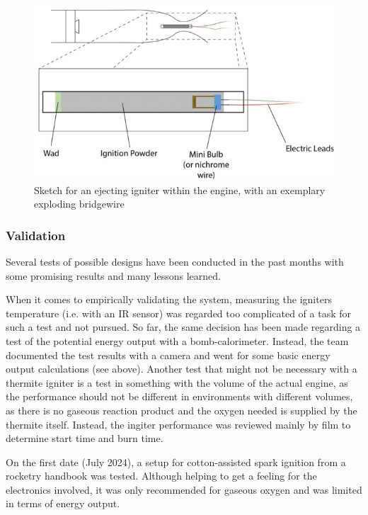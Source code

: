          \begin{figure}
            \centering
            \includegraphics[width=0.6\linewidth]{figures/Sketch of ejecting igniter in engine.png}
            \caption{Sketch for an ejecting igniter within the engine, with an exemplary exploding bridgewire}
            \label{fig:ejecting igniter with engine}
        \end{figure}


        \subsubsection{Validation}
        Several tests of possible designs have been conducted in the past months with some promising results and many lessons learned.\par
        
        When it comes to empirically validating the system, measuring the igniters temperature (i.e. with an IR sensor) was regarded too complicated of a task for such a test and not pursued. So far, the same decision has been made regarding a test of the potential energy output with a bomb-calorimeter. Instead, the team documented the test results with a camera and went for some basic energy output calculations (see above). 
        Another test that might not be necessary with a thermite igniter is a test in something with the volume of the actual engine, as the performance should not be different in environments with different volumes, as there is no gaseous reaction product and the oxygen needed is supplied by the thermite itself.
        Instead, the ingiter performance was reviewed mainly by film to determine start time and burn time.\par

        On the first date (July 2024), a setup for cotton-assisted spark ignition from a rocketry handbook was tested. Although helping to get a feeling for the electronics involved, it was only recommended for gaseous oxygen and was limited in terms of energy output. \par

